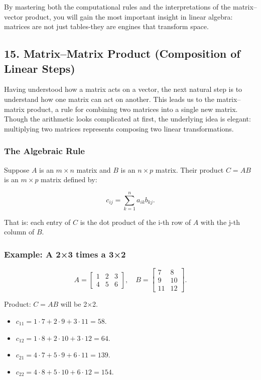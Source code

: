 \documentclass[
  letterpaper,
  DIV=11,
  numbers=noendperiod]{scrreprt}
\providecommand{\tightlist}{%
  \setlength{\itemsep}{0pt}\setlength{\parskip}{0pt}}
\begin{document}
By mastering both the computational rules and the interpretations of the
matrix--vector product, you will gain the most important insight in
linear algebra: matrices are not just tables-they are engines that
transform space.

\subsection{15. Matrix--Matrix Product (Composition of Linear
Steps)}\label{matrixmatrix-product-composition-of-linear-steps}

Having understood how a matrix acts on a vector, the next natural step
is to understand how one matrix can act on another. This leads us to the
matrix--matrix product, a rule for combining two matrices into a single
new matrix. Though the arithmetic looks complicated at first, the
underlying idea is elegant: multiplying two matrices represents
composing two linear transformations.

\subsubsection{The Algebraic Rule}\label{the-algebraic-rule-1}

Suppose \(A\) is an \(m \times n\) matrix and \(B\) is an \(n \times p\)
matrix. Their product \(C = AB\) is an \(m \times p\) matrix defined by:

\[
c_{ij} = \sum_{k=1}^n a_{ik} b_{kj}.
\]

That is: each entry of \(C\) is the dot product of the i-th row of \(A\)
with the j-th column of \(B\).

\subsubsection{Example: A 2×3 times a
3×2}\label{example-a-23-times-a-32}

\[
A = 
\begin{bmatrix} 
1 & 2 & 3 \\ 
4 & 5 & 6 
\end{bmatrix}, \quad 
B = 
\begin{bmatrix} 
7 & 8 \\ 
9 & 10 \\ 
11 & 12 
\end{bmatrix}.
\]

Product: \(C = AB\) will be 2×2.

\begin{itemize}
\tightlist
\item
  \(c_{11} = 1\cdot 7 + 2\cdot 9 + 3\cdot 11 = 58\).
\item
  \(c_{12} = 1\cdot 8 + 2\cdot 10 + 3\cdot 12 = 64\).
\item
  \(c_{21} = 4\cdot 7 + 5\cdot 9 + 6\cdot 11 = 139\).
\item
  \(c_{22} = 4\cdot 8 + 5\cdot 10 + 6\cdot 12 = 154\).
\end{itemize}
\end{document}
